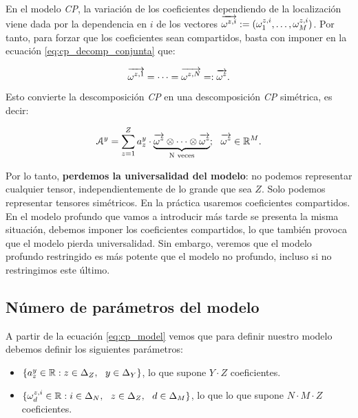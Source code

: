 En el modelo \textit{CP}, la variación de los coeficientes dependiendo de la localización viene dada por la dependencia en $i$ de los vectores $\overrightarrow{\omega^{z,i}} := (\omega^{z, i}_1, \ldots, \omega^{z, i}_M)$. Por tanto, para forzar que los coeficientes sean compartidos, basta con imponer en la ecuación \eqref{eq:cp_decomp_conjunta} que:

\begin{equation}
	\overrightarrow{\omega^{z, 1}} = \cdots = \overrightarrow{\omega^{z, N}} =: \overrightarrow{\omega^z}.
\end{equation}

Esto convierte la descomposición \textit{CP} en una descomposición \textit{CP} simétrica, es decir:

\begin{equation}
	\mathcal{A}^y = \sum_{z = 1}^Z a_z^y \cdot \underbrace{\overrightarrow{\omega^z} \otimes \cdots \otimes \overrightarrow{\omega^z}}_\textrm{N veces}; \ \  \overrightarrow{\omega^z} \in \mathbb{R}^M.
\end{equation}

Por lo tanto, \textbf{perdemos la universalidad del modelo}: no podemos representar cualquier tensor, independientemente de lo grande que sea $Z$. Solo podemos representar tensores simétricos. En la práctica usaremos coeficientes compartidos. En el modelo profundo que vamos a introducir más tarde se presenta la misma situación, debemos imponer los coeficientes compartidos, lo que también provoca que el modelo pierda universalidad. Sin embargo, veremos que el modelo profundo restringido es más potente que el modelo no profundo, incluso si no restringimos este último.

\subsection{Número de parámetros del modelo} \label{msubsec:parametros_modelo_cp}

A partir de la ecuación \eqref{eq:cp_model} vemos que para definir nuestro modelo debemos definir los siguientes parámetros:

\begin{itemize}
	\item $\{a_z^y \in \mathbb{R} : z \in \Delta_{Z}, \ \  y \in \Delta_{Y}\}$, lo que supone $Y \cdot Z$ coeficientes.
	\item $\{\omega_d^{z, i} \in \mathbb{R}: i \in \Delta_{N}, \ \  z \in \Delta_{Z}, \ \  d \in \Delta_{M}\}$, lo que lo que supone $N \cdot M \cdot Z$ coeficientes.
\end{itemize}

